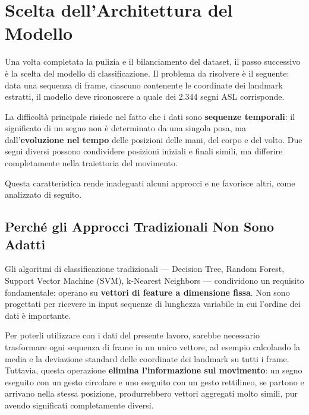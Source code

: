 
\section{Scelta dell'Architettura del Modello}

Una volta completata la pulizia e il bilanciamento del dataset, il passo successivo è la scelta del modello di classificazione. Il problema da risolvere è il seguente: data una sequenza di frame, ciascuno contenente le coordinate dei landmark estratti, il modello deve riconoscere a quale dei 2.344 segni ASL corrisponde.

La difficoltà principale risiede nel fatto che i dati sono \textbf{sequenze temporali}: il significato di un segno non è determinato da una singola posa, ma dall'\textbf{evoluzione nel tempo} delle posizioni delle mani, del corpo e del volto. Due segni diversi possono condividere posizioni iniziali e finali simili, ma differire completamente nella traiettoria del movimento.

Questa caratteristica rende inadeguati alcuni approcci e ne favorisce altri, come analizzato di seguito.

\subsection{Perché gli Approcci Tradizionali Non Sono Adatti}

Gli algoritmi di classificazione tradizionali --- Decision Tree, Random Forest, Support Vector Machine (SVM), k-Nearest Neighbors --- condividono un requisito fondamentale: operano su \textbf{vettori di feature a dimensione fissa}. Non sono progettati per ricevere in input sequenze di lunghezza variabile in cui l'ordine dei dati è importante.

Per poterli utilizzare con i dati del presente lavoro, sarebbe necessario trasformare ogni sequenza di frame in un unico vettore, ad esempio calcolando la media e la deviazione standard delle coordinate dei landmark su tutti i frame. Tuttavia, questa operazione \textbf{elimina l'informazione sul movimento}: un segno eseguito con un gesto circolare e uno eseguito con un gesto rettilineo, se partono e arrivano nella stessa posizione, produrrebbero vettori aggregati molto simili, pur avendo significati completamente diversi.

